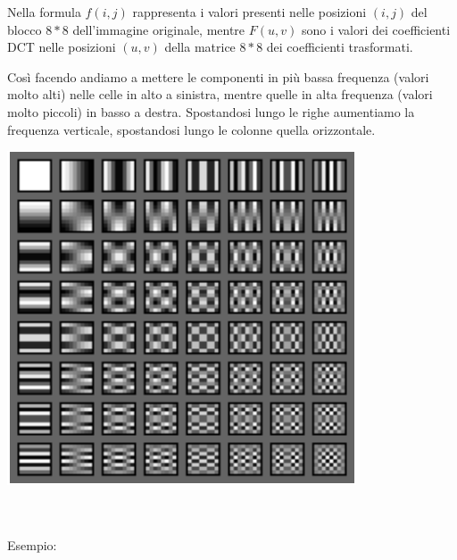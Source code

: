 \documentclass[a4paper,11pt]{article} %
\begin{document}
\begin{minipage}{0.65\textwidth}
Nella formula $f(i,j)$ rappresenta i valori presenti nelle posizioni $(i,j)$ del blocco $8*8$ dell'immagine originale, mentre $F(u,v)$ sono i valori dei coefficienti DCT nelle posizioni $(u,v)$ della matrice $8*8$ dei coefficienti trasformati.

Così facendo andiamo a mettere le componenti in più bassa frequenza (valori molto alti) nelle celle in alto a sinistra, mentre quelle in alta frequenza (valori molto piccoli) in basso a destra. Spostandosi lungo le righe aumentiamo la frequenza verticale, spostandosi lungo le colonne quella orizzontale.
\end{minipage}
\hspace{0.05\textwidth}
\begin{minipage}{0.3\textwidth}
\centering
    \includegraphics[width=\linewidth]{DCT visualization.png}
\end{minipage}
\\\\
Esempio:
\end{document}
